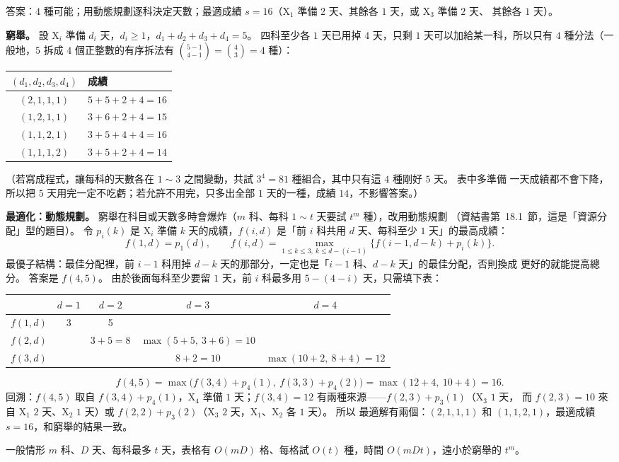 \begin{pastsoln}
答案：$4$ 種可能；用動態規劃逐科決定天數；最適成績 $s = 16$（X$_1$ 準備 $2$ 天、其餘各 $1$ 天，或 X$_3$ 準備 $2$ 天、
其餘各 $1$ 天）。

\textbf{窮舉。} 設 X$_i$ 準備 $d_i$ 天，$d_i \ge 1$，$d_1 + d_2 + d_3 + d_4 = 5$。 四科至少各 $1$ 天已用掉 $4$ 天，只剩
$1$ 天可以加給某一科，所以只有 $4$ 種分法（一般地，$5$ 拆成 $4$ 個正整數的有序拆法有 $\binom{5-1}{4-1} = \binom{4}{3} = 4$ 種）：
\begin{center}
\begin{tabular}{cl}
\toprule
$(d_1, d_2, d_3, d_4)$ & 成績 \\
\midrule
$(2, 1, 1, 1)$ & $5 + 5 + 2 + 4 = 16$ \\
$(1, 2, 1, 1)$ & $3 + 6 + 2 + 4 = 15$ \\
$(1, 1, 2, 1)$ & $3 + 5 + 4 + 4 = 16$ \\
$(1, 1, 1, 2)$ & $3 + 5 + 2 + 4 = 14$ \\
\bottomrule
\end{tabular}
\end{center}
（若寫成程式，讓每科的天數各在 $1 \sim 3$ 之間變動，共試 $3^4 = 81$ 種組合，其中只有這 $4$ 種剛好 $5$ 天。 表中多準備
一天成績都不會下降，所以把 $5$ 天用完一定不吃虧；若允許不用完，只多出全部 $1$ 天的一種，成績 $14$，不影響答案。）

\textbf{最適化：動態規劃。} 窮舉在科目或天數多時會爆炸（$m$ 科、每科 $1 \sim t$ 天要試 $t^m$ 種），改用動態規劃
（資結書第~18.1~節，這是「資源分配」型的題目）。 令 $p_i(k)$ 是 X$_i$ 準備 $k$ 天的成績，$f(i, d)$ 是「前 $i$ 科共用
$d$ 天、每科至少 $1$ 天」的最高成績：
\[
f(1, d) = p_1(d),\qquad
f(i, d) = \max_{1 \le k \le 3,\ k \le d - (i-1)} \bigl\{ f(i-1, d-k) + p_i(k) \bigr\}.
\]
最優子結構：最佳分配裡，前 $i - 1$ 科用掉 $d - k$ 天的那部分，一定也是「$i - 1$ 科、$d - k$ 天」的最佳分配，否則換成
更好的就能提高總分。 答案是 $f(4, 5)$。 由於後面每科至少要留 $1$ 天，前 $i$ 科最多用 $5 - (4 - i)$ 天，只需填下表：
\begin{center}
\begin{tabular}{lcccc}
\toprule
 & $d = 1$ & $d = 2$ & $d = 3$ & $d = 4$ \\
\midrule
$f(1, d)$ & 3 & 5 & & \\
$f(2, d)$ & & $3 + 5 = 8$ & $\max(5 + 5,\ 3 + 6) = 10$ & \\
$f(3, d)$ & & & $8 + 2 = 10$ & $\max(10 + 2,\ 8 + 4) = 12$ \\
\bottomrule
\end{tabular}
\end{center}
\[
f(4, 5) = \max\bigl( f(3, 4) + p_4(1),\ f(3, 3) + p_4(2) \bigr) = \max(12 + 4,\ 10 + 4) = 16.
\]
回溯：$f(4, 5)$ 取自 $f(3, 4) + p_4(1)$，X$_4$ 準備 $1$ 天；$f(3, 4) = 12$ 有兩種來源——$f(2, 3) + p_3(1)$（X$_3$ $1$ 天，
而 $f(2, 3) = 10$ 來自 X$_1$ $2$ 天、X$_2$ $1$ 天）或 $f(2, 2) + p_3(2)$（X$_3$ $2$ 天，X$_1$、X$_2$ 各 $1$ 天）。 所以
最適解有兩個：$(2, 1, 1, 1)$ 和 $(1, 1, 2, 1)$，最適成績 $s = 16$，和窮舉的結果一致。

一般情形 $m$ 科、$D$ 天、每科最多 $t$ 天，表格有 $O(mD)$ 格、每格試 $O(t)$ 種，時間 $O(mDt)$，遠小於窮舉的 $t^m$。
\end{pastsoln}
